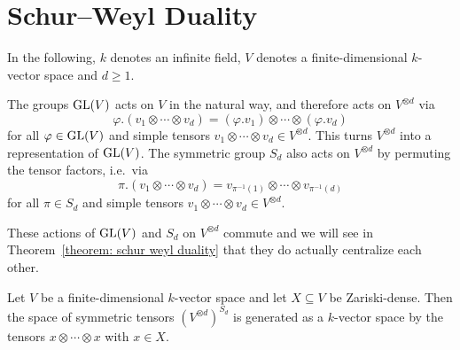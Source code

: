 \section{Schur--Weyl Duality}

\begin{conventions}
  In the following, $k$ denotes an infinite field, $V$ denotes a finite-dimensional $k$-vector space and $d \geq 1$.
\end{conventions}

\begin{fluff}
  The groups $\operatorname{GL}(V)$ acts on $V$ in the natural way, and therefore acts on $V^{\otimes d}$ via
  \[
      \varphi.(v_1 \otimes \dotsb \otimes v_d)
    = (\varphi.v_1) \otimes \dotsb \otimes (\varphi.v_d)
  \]
  for all $\varphi \in \operatorname{GL}(V)$ and simple tensors $v_1 \otimes \dotsb \otimes v_d \in V^{\otimes d}$.
  This turns $V^{\otimes d}$ into a representation of $\operatorname{GL}(V)$.
  The symmetric group $S_d$ also acts on $V^{\otimes d}$ by permuting the tensor factors, i.e.\ via
  \[
      \pi.(v_1 \otimes \dotsb \otimes v_d)
    = v_{\pi^{-1}(1)} \otimes \dotsb \otimes v_{\pi^{-1}(d)}
  \]
  for all $\pi \in S_d$ and simple tensors $v_1 \otimes \dotsb \otimes v_d \in V^{\otimes d}$. 
  
  These actions of $\operatorname{GL}(V)$ and $S_d$ on $V^{\otimes d}$ commute and we will see in Theorem~\ref{theorem: schur weyl duality} that they do actually centralize each other.
\end{fluff}


\begin{lemma}
  \label{lemma: symmetric tensors and zariski dense subsets}
  Let $V$ be a finite-dimensional $k$-vector space and let $X \subseteq V$ be Zariski-dense.
  Then the space of symmetric tensors $( V^{\otimes d} )^{S_d}$ is generated as a $k$-vector space by the tensors $x \otimes \dotsb \otimes x$ with $x \in X$.
\end{lemma}


